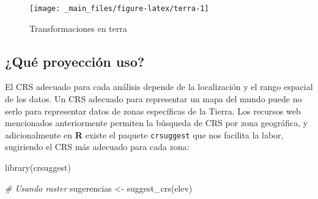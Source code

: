 \documentclass[
]{book}
\newenvironment{Shaded}{\begin{snugshade}}{\end{snugshade}}
\newcommand{\CommentTok}[1]{\textcolor[rgb]{0.56,0.35,0.01}{\textit{#1}}}
\newcommand{\FunctionTok}[1]{\textcolor[rgb]{0.00,0.00,0.00}{#1}}
\newcommand{\NormalTok}[1]{#1}
\newcommand{\OtherTok}[1]{\textcolor[rgb]{0.56,0.35,0.01}{#1}}
\begin{document}
\begin{figure}

{\centering \texttt{[image: \_main\_files/figure-latex/terra-1]} 

}

\caption{Transformaciones en terra}\label{fig:terra}
\end{figure}

\hypertarget{quecrsuso}{%
\subsection{¿Qué proyección uso?}\label{quecrsuso}}

El CRS adecuado para cada análisis depende de la localización y el rango
espacial de los datos. Un CRS adecuado para representar un mapa del mundo puede
no serlo para representar datos de zonas específicas de la Tierra. Los recursos
web mencionados anteriormente permiten la búsqueda de CRS por zona geográfica, y
adicionalmente en \textbf{R} existe el paquete \texttt{crsuggest} \citep{R-crsuggest} que nos
facilita la labor, sugiriendo el CRS más adecuado para cada zona:

\begin{Shaded}
\begin{Highlighting}[]
\FunctionTok{library}\NormalTok{(crsuggest)}

\CommentTok{\# Usando raster}
\NormalTok{sugerencias }\OtherTok{\textless{}{-}} \FunctionTok{suggest\_crs}\NormalTok{(elev)}
\end{Highlighting}
\end{Shaded}
\end{document}
